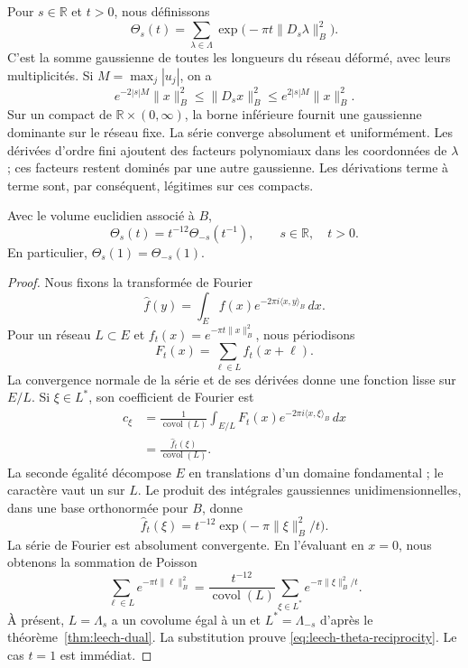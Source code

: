 Pour \(s\in\mathbb R\) et \(t>0\), nous définissons
\begin{equation}
 \Theta_s(t)=\sum_{\lambda\in\Lambda}
                \exp\bigl(-\pi t\|D_s\lambda\|_B^2\bigr).
 \label{eq:leech-theta-real}
\end{equation}
C’est la somme gaussienne de toutes les longueurs du réseau déformé,
avec leurs multiplicités. Si \(M=\max_j|u_j|\), on a
\begin{equation}
 e^{-2|s|M}\|x\|_B^2
 \leq\|D_sx\|_B^2
 \leq e^{2|s|M}\|x\|_B^2.
 \label{eq:leech-quadratic-bounds}
\end{equation}
Sur un compact de \(\mathbb R\times(0,\infty)\), la borne
inférieure fournit une gaussienne dominante sur le réseau fixe.
La série converge absolument et uniformément. Les dérivées
d’ordre fini ajoutent des facteurs polynomiaux dans les coordonnées de
\(\lambda\) ; ces facteurs restent dominés par une autre gaussienne.
Les dérivations terme à terme sont, par conséquent,
légitimes sur ces compacts.

\begin{theorem}
\label{thm:leech-theta}
Avec le volume euclidien associé à \(B\),
\begin{equation}
 \Theta_s(t)=t^{-12}\Theta_{-s}(t^{-1}),
 \qquad s\in\mathbb R,\quad t>0.
 \label{eq:leech-theta-reciprocity}
\end{equation}
En particulier, \(\Theta_s(1)=\Theta_{-s}(1)\).
\end{theorem}
\begin{proof}
Nous fixons la transformée de Fourier
\[
 \widehat f(y)=\int_E
      f(x)e^{-2\pi i\langle x,y\rangle_B}\,dx.
\]
Pour un réseau \(L\subset E\) et
\(f_t(x)=e^{-\pi t\|x\|_B^2}\), nous périodisons
\[
 F_t(x)=\sum_{\ell\in L}f_t(x+\ell).
\]
La convergence normale de la série et de ses dérivées donne une fonction lisse sur \(E/L\). Si \(\xi\in L^*\), son coefficient de Fourier est
\[
\begin{split}
 c_\xi
 &=\frac1{\operatorname{covol}(L)}
   \int_{E/L}F_t(x)e^{-2\pi i\langle x,\xi\rangle_B}\,dx\\
 &=\frac{\widehat f_t(\xi)}{\operatorname{covol}(L)}.
\end{split}
\]
La seconde égalité décompose \(E\) en translations d’un domaine
fondamental ; le caractère vaut un sur \(L\). Le produit
des intégrales gaussiennes unidimensionnelles, dans une base
orthonormée pour \(B\), donne
\[
 \widehat f_t(\xi)=
 t^{-12}\exp\bigl(-\pi\|\xi\|_B^2/t\bigr).
\]
La série de Fourier est absolument convergente. En l’évaluant en
\(x=0\), nous obtenons la sommation de Poisson
\[
 \sum_{\ell\in L}e^{-\pi t\|\ell\|_B^2}
 =\frac{t^{-12}}{\operatorname{covol}(L)}
      \sum_{\xi\in L^*}e^{-\pi\|\xi\|_B^2/t}.
\]
À présent, \(L=\Lambda_s\) a un covolume égal à un et \(L^*=\Lambda_{-s}\) d'après le théorème~\ref{thm:leech-dual}. La substitution prouve \eqref{eq:leech-theta-reciprocity}. Le cas \(t=1\) est immédiat.
\end{proof}

